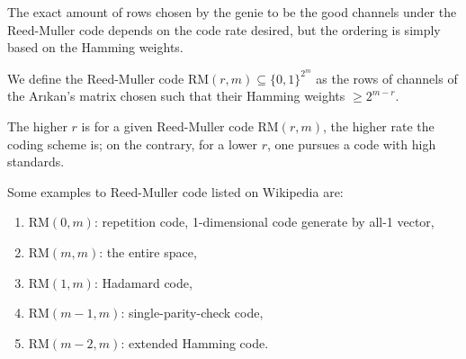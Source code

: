 The exact amount of rows chosen by the genie to be the good channels under the Reed-Muller code depends on the code rate desired, but the ordering is simply based on the Hamming weights.
\begin{definition}
    We define the Reed-Muller code $\mathrm{RM}(r,m)\subseteq\{0,1\}^{2^m}$ as the rows of channels of the Ar{\i}kan's matrix chosen such that their Hamming weights $\ge 2^{m-r}$.
\end{definition}
The higher $r$ is for a given Reed-Muller code $\mathrm{RM}(r,m)$, the higher rate the coding scheme is; on the contrary, for a lower $r$, one pursues a code with high standards.

\begin{remark}
    Some examples to Reed-Muller code listed on Wikipedia are:
    \begin{enumerate}
        \item $\mathrm{RM}(0,m)$: repetition code, 1-dimensional code generate by all-1 vector,
        \item $\mathrm{RM}(m,m)$: the entire space,
        \item $\mathrm{RM}(1,m)$: Hadamard code,
        \item $\mathrm{RM}(m-1,m)$: single-parity-check code,
        \item $\mathrm{RM}(m-2,m)$: extended Hamming code.
    \end{enumerate}
\end{remark}